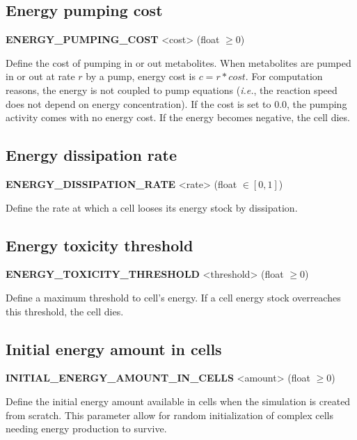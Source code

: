 
\subsection{Energy pumping cost}
\begin{center}
{\bf ENERGY\_PUMPING\_COST} <cost> (float $\ge 0$)
\end{center}
Define the cost of pumping in or out metabolites. When metabolites are pumped in or out at rate $r$ by a pump, energy cost is $c = r*cost$. For computation reasons, the energy is not coupled to pump equations (\textit{i.e.}, the reaction speed does not depend on energy concentration). If the cost is set to 0.0, the pumping activity comes with no energy cost. If the energy becomes negative, the cell dies.


\subsection{Energy dissipation rate}
\begin{center}
{\bf ENERGY\_DISSIPATION\_RATE} <rate> (float $\in [0, 1]$)
\end{center}
Define the rate at which a cell looses its energy stock by dissipation.


\subsection{Energy toxicity threshold}
\begin{center}
{\bf ENERGY\_TOXICITY\_THRESHOLD} <threshold> (float $\ge 0$)
\end{center}
Define a maximum threshold to cell's energy. If a cell energy stock overreaches this threshold, the cell dies.


\subsection{Initial energy amount in cells}
\begin{center}
{\bf INITIAL\_ENERGY\_AMOUNT\_IN\_CELLS} <amount> (float $\ge 0$)
\end{center}
Define the initial energy amount available in cells when the simulation is created from scratch. This parameter allow for random initialization of complex cells needing energy production to survive.


